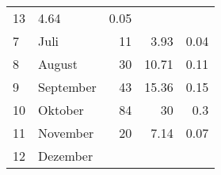 \begin{longtable}{lXrrr}
       \num{13} &
       \num[round-mode=places,round-precision=2]{4.64} &
         \num[round-mode=places,round-precision=2]{0.05} \\

     7 &
     \multicolumn{1}{X}{ Juli   } &


       \num{11} &
       \num[round-mode=places,round-precision=2]{3.93} &
         \num[round-mode=places,round-precision=2]{0.04} \\

     8 &
     \multicolumn{1}{X}{ August   } &


       \num{30} &
       \num[round-mode=places,round-precision=2]{10.71} &
         \num[round-mode=places,round-precision=2]{0.11} \\

     9 &
     \multicolumn{1}{X}{ September   } &


       \num{43} &
       \num[round-mode=places,round-precision=2]{15.36} &
         \num[round-mode=places,round-precision=2]{0.15} \\

     10 &
     \multicolumn{1}{X}{ Oktober   } &


       \num{84} &
       \num[round-mode=places,round-precision=2]{30} &
         \num[round-mode=places,round-precision=2]{0.3} \\

     11 &
     \multicolumn{1}{X}{ November   } &


       \num{20} &
       \num[round-mode=places,round-precision=2]{7.14} &
         \num[round-mode=places,round-precision=2]{0.07} \\

     12 &
     \multicolumn{1}{X}{ Dezember   } &



\end{longtable}
